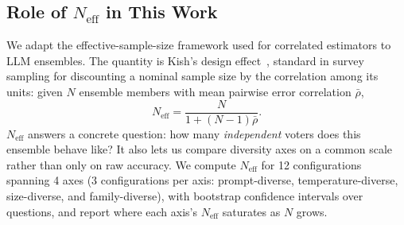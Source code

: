 \documentclass[conference]{IEEEtran}
\begin{document}
\subsection{Role of $N_\text{eff}$ in This Work}
We adapt the effective-sample-size framework used for correlated estimators
to LLM ensembles. The quantity is Kish's design effect~\cite{kish1965survey},
standard in survey sampling for discounting a nominal sample size by the
correlation among its units: given $N$ ensemble members with mean pairwise
error correlation $\bar\rho$,
\begin{equation}
N_\text{eff} = \frac{N}{1 + (N-1)\bar\rho}.
\label{eq:neff}
\end{equation}
$N_\text{eff}$ answers a concrete question: how many \emph{independent}
voters does this ensemble behave like? It also lets us compare diversity
axes on a common scale rather than only on raw accuracy. We compute
$N_\text{eff}$ for 12 configurations spanning 4 axes (3 configurations per
axis: prompt-diverse, temperature-diverse, size-diverse, and
family-diverse), with bootstrap confidence intervals over questions, and
report where each axis's $N_\text{eff}$ saturates as $N$ grows.
\end{document}
